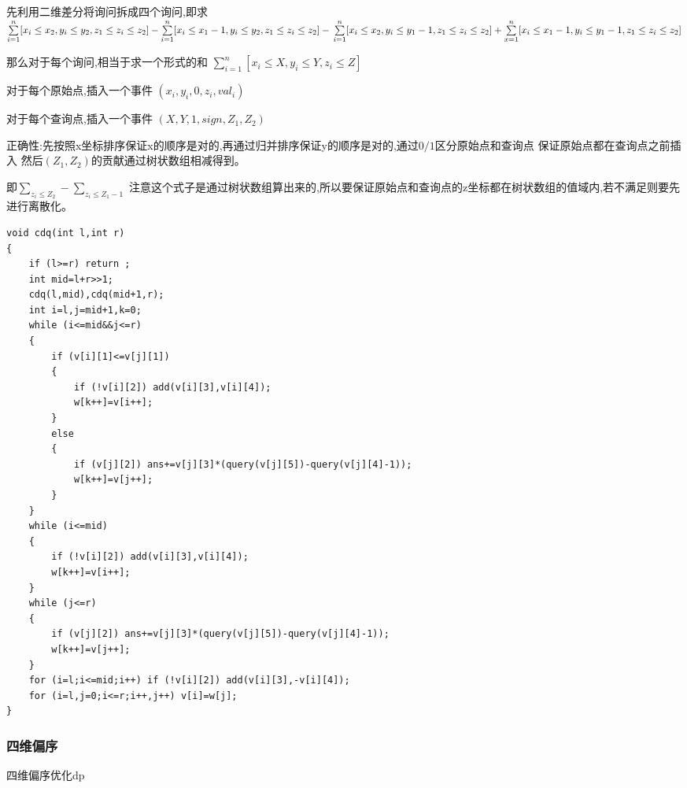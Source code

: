 \documentclass[a4paper]{ctexart}
\begin{document}
先利用二维差分将询问拆成四个询问,即求$\sum\limits_{i=1}^n[x_i\le x_2,y_i\le y_2,z_1\le z_i\le z_2]-\sum\limits_{i=1}^n[x_i\le x_1-1,y_i\le y_2,z_1\le z_i\le z_2]-\\\sum\limits_{i=1}^n[x_i\le x_2,y_i\le y_1-1,z_1\le z_i\le z_2]+\sum\limits_{x=1}^n[x_i\le x_1-1,y_i\le y_1-1,z_1\le z_i\le z_2]$

那么对于每个询问,相当于求一个形式的和 $\sum\limits_{i=1}^n[x_i\le X,y_i\le Y,z_i\le Z]$

对于每个原始点,插入一个事件 $(x_i,y_i,0,z_i,val_i)$

对于每个查询点,插入一个事件 $(X,Y,1,sign,Z_1,Z_2)$

正确性:先按照x坐标排序保证x的顺序是对的,再通过归并排序保证y的顺序是对的,通过$0/1$区分原始点和查询点 保证原始点都在查询点之前插入 然后$(Z_1,Z_2)$的贡献通过树状数组相减得到。

即$\sum\limits_{z_i\le Z_2}-\sum\limits_{z_i\le Z_1-1}$  注意这个式子是通过树状数组算出来的,所以要保证原始点和查询点的z坐标都在树状数组的值域内,若不满足则要先进行离散化。
\begin{lstlisting}
void cdq(int l,int r)
{
    if (l>=r) return ;
    int mid=l+r>>1;
    cdq(l,mid),cdq(mid+1,r);
    int i=l,j=mid+1,k=0;
    while (i<=mid&&j<=r)
    {
        if (v[i][1]<=v[j][1])
        {
            if (!v[i][2]) add(v[i][3],v[i][4]);
            w[k++]=v[i++];
        }
        else
        {
            if (v[j][2]) ans+=v[j][3]*(query(v[j][5])-query(v[j][4]-1));
            w[k++]=v[j++];
        }
    }
    while (i<=mid)
    {
        if (!v[i][2]) add(v[i][3],v[i][4]);
        w[k++]=v[i++];
    }
    while (j<=r)
    {
        if (v[j][2]) ans+=v[j][3]*(query(v[j][5])-query(v[j][4]-1));
        w[k++]=v[j++];
    }
    for (i=l;i<=mid;i++) if (!v[i][2]) add(v[i][3],-v[i][4]);
    for (i=l,j=0;i<=r;i++,j++) v[i]=w[j];
}
\end{lstlisting}

\subsubsection{四维偏序}

四维偏序优化dp
\end{document}
